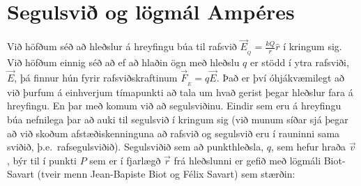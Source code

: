 \ifdefined \wholebook \else\documentclass[oneside]{book}\usepackage{EdlBook}\graphicspath{{figures/}}
\begin{document}
%
\setcounter{chapter}{17} %
%
\fi

\renewcommand{\thefigure}{\arabic{figure}}

\chapter{Segulsvið og lögmál Ampéres}

Við höfðum séð að hleðslur á hreyfingu búa til rafsvið $\Vec{E}_{\!_Q} = \frac{kQ}{r}\hat{r}$ í kringum sig. Við höfðum einnig séð að ef að hlaðin ögn með hleðslu $q$ er stödd í ytra rafsviði, $\Vec{E}$, þá finnur hún fyrir rafsviðskraftinum $\Vec{F}_{\!_E} = q\Vec{E}$. Það er því óhjákvæmilegt að við þurfum á einhverjum tímapunkti að tala um hvað gerist þegar hleðslur fara á hreyfingu. En þar með komum við að segulsviðinu. Eindir sem eru á hreyfingu búa nefnilega þar að auki til segulsvið í kringum sig (við munum síðar sjá þegar að við skoðum afstæðiskenninguna að rafsvið og segulsvið eru í rauninni sama sviðið, þ.e.~rafsegulsviðið). Segulsviðið sem að punkthleðsla, $q$, sem hefur hraða $\Vec{v}$, býr til í punkti $P$ sem er í fjarlægð $\Vec{r}$ frá hleðslunni er gefið með lögmáli Biot-Savart (tveir menn Jean-Bapiste Biot og Félix Savart) sem stærðin:
\end{document}
